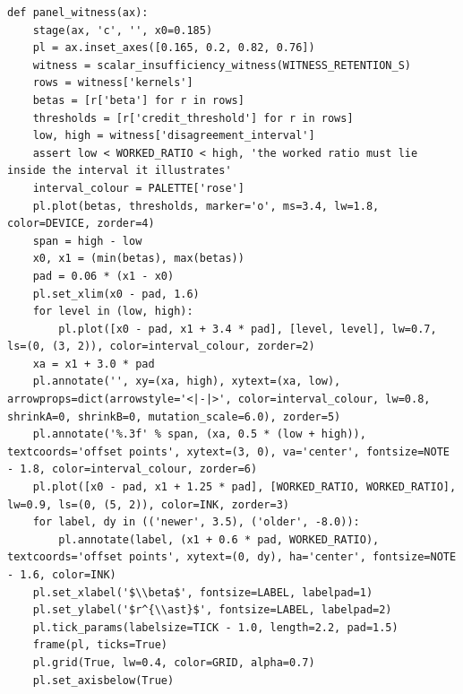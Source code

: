 \documentclass[a4paper,10pt]{article}
\begin{document}
\begin{Verbatim}
def panel_witness(ax):
    stage(ax, 'c', '', x0=0.185)
    pl = ax.inset_axes([0.165, 0.2, 0.82, 0.76])
    witness = scalar_insufficiency_witness(WITNESS_RETENTION_S)
    rows = witness['kernels']
    betas = [r['beta'] for r in rows]
    thresholds = [r['credit_threshold'] for r in rows]
    low, high = witness['disagreement_interval']
    assert low < WORKED_RATIO < high, 'the worked ratio must lie inside the interval it illustrates'
    interval_colour = PALETTE['rose']
    pl.plot(betas, thresholds, marker='o', ms=3.4, lw=1.8, color=DEVICE, zorder=4)
    span = high - low
    x0, x1 = (min(betas), max(betas))
    pad = 0.06 * (x1 - x0)
    pl.set_xlim(x0 - pad, 1.6)
    for level in (low, high):
        pl.plot([x0 - pad, x1 + 3.4 * pad], [level, level], lw=0.7, ls=(0, (3, 2)), color=interval_colour, zorder=2)
    xa = x1 + 3.0 * pad
    pl.annotate('', xy=(xa, high), xytext=(xa, low), arrowprops=dict(arrowstyle='<|-|>', color=interval_colour, lw=0.8, shrinkA=0, shrinkB=0, mutation_scale=6.0), zorder=5)
    pl.annotate('%.3f' % span, (xa, 0.5 * (low + high)), textcoords='offset points', xytext=(3, 0), va='center', fontsize=NOTE - 1.8, color=interval_colour, zorder=6)
    pl.plot([x0 - pad, x1 + 1.25 * pad], [WORKED_RATIO, WORKED_RATIO], lw=0.9, ls=(0, (5, 2)), color=INK, zorder=3)
    for label, dy in (('newer', 3.5), ('older', -8.0)):
        pl.annotate(label, (x1 + 0.6 * pad, WORKED_RATIO), textcoords='offset points', xytext=(0, dy), ha='center', fontsize=NOTE - 1.6, color=INK)
    pl.set_xlabel('$\\beta$', fontsize=LABEL, labelpad=1)
    pl.set_ylabel('$r^{\\ast}$', fontsize=LABEL, labelpad=2)
    pl.tick_params(labelsize=TICK - 1.0, length=2.2, pad=1.5)
    frame(pl, ticks=True)
    pl.grid(True, lw=0.4, color=GRID, alpha=0.7)
    pl.set_axisbelow(True)


\end{Verbatim}
\end{document}
